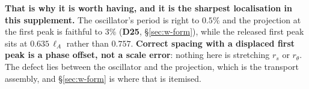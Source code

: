 \textbf{That is why it is worth having, and it is the sharpest localisation in
this supplement.} The oscillator's period is right to $0.5\%$ and the
projection at the first peak is faithful to $3\%$ (\textbf{D25},
\S\ref{sec:w-form}), while the released first peak sits at $0.635\,\ell_A$
rather than $0.757$. \textbf{Correct spacing with a displaced first peak
is a phase offset, not a scale error}: nothing here is stretching $r_s$ or
$r_\theta$. The defect lies between the oscillator and the projection, which is
the transport assembly, and \S\ref{sec:w-form} is where that is itemised.
